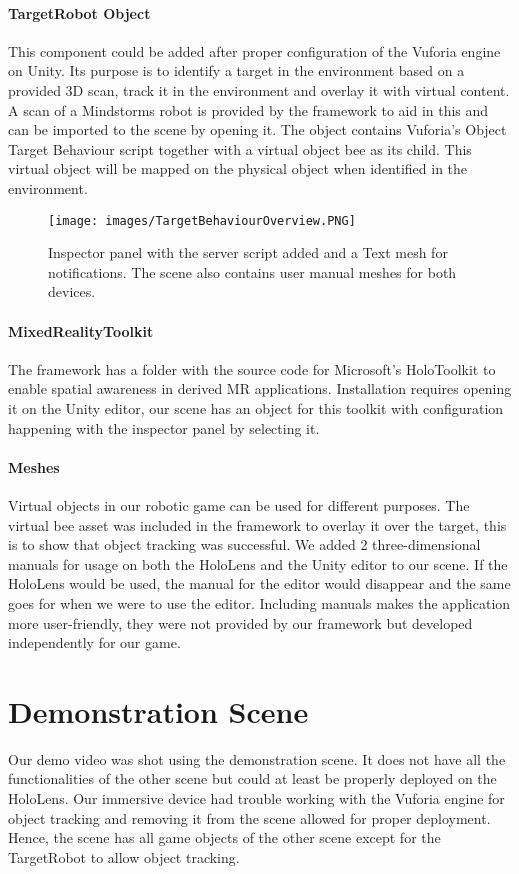 \paragraph{TargetRobot Object}
This component could be added after proper configuration of the Vuforia engine on Unity. Its purpose is to identify a target in the environment based on a provided 3D scan, track it in the environment and overlay it with virtual content. A scan of a Mindstorms robot is provided by the framework to aid in this and can be imported to the scene by opening it. The object contains Vuforia's Object Target Behaviour script together with a virtual object bee as its child. This virtual object will be mapped on the physical object when identified in the environment.

\begin{figure}[!htb]
	\texttt{[image: images/TargetBehaviourOverview.PNG]}
	\captionsetup{width=1.0\textwidth}
	\centering
	\caption{Inspector panel with the server script added and a Text mesh for notifications. The scene also contains user manual meshes for both devices.}
\end{figure}
\newpage
\paragraph{MixedRealityToolkit}
The framework has a folder with the source code for Microsoft's HoloToolkit to enable spatial awareness in derived MR applications. Installation requires opening it on the Unity editor, our scene has an object for this toolkit with configuration happening with the inspector panel by selecting it. 

\paragraph{Meshes}
Virtual objects in our robotic game can be used for different purposes. The virtual bee asset was included in the framework to overlay it over the target, this is to show that object tracking was successful. We added 2 three-dimensional manuals for usage on both the HoloLens and the Unity editor to our scene. If the HoloLens would be used, the manual for the editor would disappear and the same goes for when we were to use the editor. Including manuals makes the application more user-friendly, they were not provided by our framework but developed independently for our game.

\newpage
\section{Demonstration Scene}
Our demo video was shot using the demonstration scene. It does not have all the functionalities of the other scene but could at least be properly deployed on the HoloLens. Our immersive device had trouble working with the Vuforia engine for object tracking and removing it from the scene allowed for proper deployment. Hence, the scene has all game objects of the other scene except for the TargetRobot to allow object tracking.


